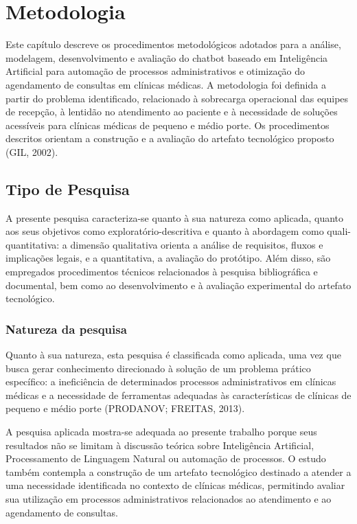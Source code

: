 \documentclass[12pt,a4paper]{extarticle}
\begin{document}
\newpage
\section{Metodologia}
\label{cap:metodologia}

Este capítulo descreve os procedimentos metodológicos adotados para a análise, modelagem, desenvolvimento e avaliação do chatbot baseado em Inteligência Artificial para automação de processos administrativos e otimização do agendamento de consultas em clínicas médicas. A metodologia foi definida a partir do problema identificado, relacionado à sobrecarga operacional das equipes de recepção, à lentidão no atendimento ao paciente e à necessidade de soluções acessíveis para clínicas médicas de pequeno e médio porte. Os procedimentos descritos orientam a construção e a avaliação do artefato tecnológico proposto (GIL, 2002).

\subsection{Tipo de Pesquisa}

A presente pesquisa caracteriza-se quanto à sua natureza como aplicada, quanto aos seus objetivos como exploratório-descritiva e quanto à abordagem como quali-quantitativa: a dimensão qualitativa orienta a análise de requisitos, fluxos e implicações legais, e a quantitativa, a avaliação do protótipo. Além disso, são empregados procedimentos técnicos relacionados à pesquisa bibliográfica e documental, bem como ao desenvolvimento e à avaliação experimental do artefato tecnológico.

\subsubsection{Natureza da pesquisa}

Quanto à sua natureza, esta pesquisa é classificada como aplicada, uma vez que busca gerar conhecimento direcionado à solução de um problema prático específico: a ineficiência de determinados processos administrativos em clínicas médicas e a necessidade de ferramentas adequadas às características de clínicas de pequeno e médio porte (PRODANOV; FREITAS, 2013).

A pesquisa aplicada mostra-se adequada ao presente trabalho porque seus resultados não se limitam à discussão teórica sobre Inteligência Artificial, Processamento de Linguagem Natural ou automação de processos. O estudo também contempla a construção de um artefato tecnológico destinado a atender a uma necessidade identificada no contexto de clínicas médicas, permitindo avaliar sua utilização em processos administrativos relacionados ao atendimento e ao agendamento de consultas.
\end{document}
